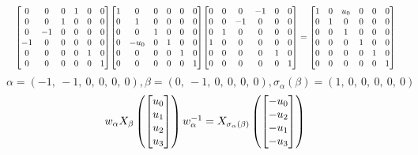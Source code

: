\documentclass[11pt]{article}
\theoremstyle{definition}
\begin{document}
\[
\scaletoalign{\textwidth}{{\left[\begin{matrix}0 & 0 & 0 & 1 & 0 & 0\\0 & 0 & 1 & 0 & 0 & 0\\0 & -1 & 0 & 0 & 0 & 0\\-1 & 0 & 0 & 0 & 0 & 0\\0 & 0 & 0 & 0 & 1 & 0\\0 & 0 & 0 & 0 & 0 & 1\end{matrix}\right]} {\left[\begin{matrix}1 & 0 & 0 & 0 & 0 & 0\\0 & 1 & 0 & 0 & 0 & 0\\0 & 0 & 1 & 0 & 0 & 0\\0 & - u_{0} & 0 & 1 & 0 & 0\\0 & 0 & 0 & 0 & 1 & 0\\0 & 0 & 0 & 0 & 0 & 1\end{matrix}\right]} {\left[\begin{matrix}0 & 0 & 0 & -1 & 0 & 0\\0 & 0 & -1 & 0 & 0 & 0\\0 & 1 & 0 & 0 & 0 & 0\\1 & 0 & 0 & 0 & 0 & 0\\0 & 0 & 0 & 0 & 1 & 0\\0 & 0 & 0 & 0 & 0 & 1\end{matrix}\right]} = {\left[\begin{matrix}1 & 0 & u_{0} & 0 & 0 & 0\\0 & 1 & 0 & 0 & 0 & 0\\0 & 0 & 1 & 0 & 0 & 0\\0 & 0 & 0 & 1 & 0 & 0\\0 & 0 & 0 & 0 & 1 & 0\\0 & 0 & 0 & 0 & 0 & 1\end{matrix}\right]}}
\]
\[
\alpha = \left( -1, \  -1, \  0, \  0, \  0, \  0\right), \beta = \left( 0, \  -1, \  0, \  0, \  0, \  0\right), \sigma_{\alpha}(\beta) = \left( 1, \  0, \  0, \  0, \  0, \  0\right)
\]
\[
\scaletoalign{\textwidth}{w_{\alpha} X_{\beta}\left(\left[\begin{matrix}u_{0}\\u_{1}\\u_{2}\\u_{3}\end{matrix}\right]\right) w_{\alpha}^{-1} = X_{\sigma_{\alpha}\left(\beta\right)}\left(\left[\begin{matrix}- u_{0}\\- u_{2}\\- u_{1}\\- u_{3}\end{matrix}\right]\right)}
\]
\end{document}
